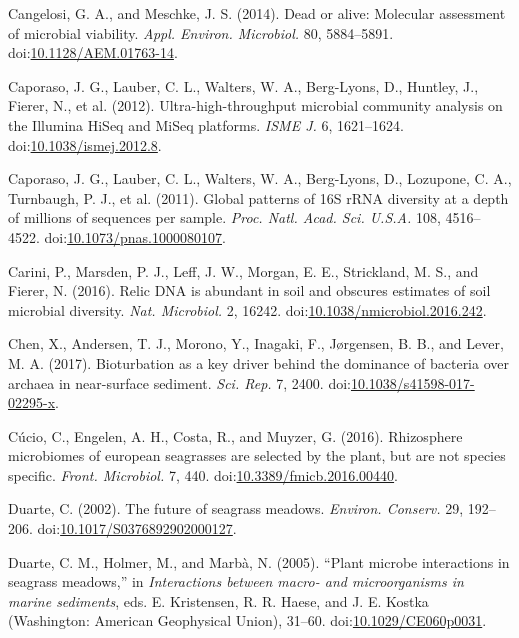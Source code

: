 \documentclass[12pt,]{article}
\begin{document}
\leavevmode\hypertarget{ref-Cangelosi2014}{}%
Cangelosi, G. A., and Meschke, J. S. (2014). Dead or alive: Molecular
assessment of microbial viability. \emph{Appl. Environ. Microbiol.} 80,
5884--5891.
doi:\href{https://doi.org/10.1128/AEM.01763-14}{10.1128/AEM.01763-14}.

\leavevmode\hypertarget{ref-Caporaso2012a}{}%
Caporaso, J. G., Lauber, C. L., Walters, W. A., Berg-Lyons, D., Huntley,
J., Fierer, N., et al. (2012). Ultra-high-throughput microbial community
analysis on the Illumina HiSeq and MiSeq platforms. \emph{ISME J.} 6,
1621--1624.
doi:\href{https://doi.org/10.1038/ismej.2012.8}{10.1038/ismej.2012.8}.

\leavevmode\hypertarget{ref-Caporaso2011a}{}%
Caporaso, J. G., Lauber, C. L., Walters, W. A., Berg-Lyons, D.,
Lozupone, C. A., Turnbaugh, P. J., et al. (2011). Global patterns of 16S
rRNA diversity at a depth of millions of sequences per sample.
\emph{Proc. Natl. Acad. Sci. U.S.A.} 108, 4516--4522.
doi:\href{https://doi.org/10.1073/pnas.1000080107}{10.1073/pnas.1000080107}.

\leavevmode\hypertarget{ref-Carini2016}{}%
Carini, P., Marsden, P. J., Leff, J. W., Morgan, E. E., Strickland, M.
S., and Fierer, N. (2016). Relic DNA is abundant in soil and obscures
estimates of soil microbial diversity. \emph{Nat. Microbiol.} 2, 16242.
doi:\href{https://doi.org/10.1038/nmicrobiol.2016.242}{10.1038/nmicrobiol.2016.242}.

\leavevmode\hypertarget{ref-Chen2017}{}%
Chen, X., Andersen, T. J., Morono, Y., Inagaki, F., Jørgensen, B. B.,
and Lever, M. A. (2017). Bioturbation as a key driver behind the
dominance of bacteria over archaea in near-surface sediment. \emph{Sci.
Rep.} 7, 2400.
doi:\href{https://doi.org/10.1038/s41598-017-02295-x}{10.1038/s41598-017-02295-x}.

\leavevmode\hypertarget{ref-Cucio2016a}{}%
Cúcio, C., Engelen, A. H., Costa, R., and Muyzer, G. (2016). Rhizosphere
microbiomes of european seagrasses are selected by the plant, but are
not species specific. \emph{Front. Microbiol.} 7, 440.
doi:\href{https://doi.org/10.3389/fmicb.2016.00440}{10.3389/fmicb.2016.00440}.

\leavevmode\hypertarget{ref-Duarte2002}{}%
Duarte, C. (2002). The future of seagrass meadows. \emph{Environ.
Conserv.} 29, 192--206.
doi:\href{https://doi.org/10.1017/S0376892902000127}{10.1017/S0376892902000127}.

\leavevmode\hypertarget{ref-Duarte2005}{}%
Duarte, C. M., Holmer, M., and Marbà, N. (2005). ``Plant microbe
interactions in seagrass meadows,'' in \emph{Interactions between macro-
and microorganisms in marine sediments}, eds. E. Kristensen, R. R.
Haese, and J. E. Kostka (Washington: American Geophysical Union),
31--60.
doi:\href{https://doi.org/10.1029/CE060p0031}{10.1029/CE060p0031}.
\end{document}

